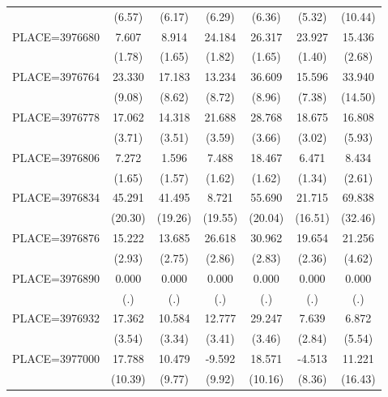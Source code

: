 {\begin{tabular}{l*{6}{c}}
                    &      (6.57)&      (6.17)&      (6.29)&      (6.36)&      (5.32)&     (10.44)\\
PLACE=3976680       &       7.607&       8.914&      24.184&      26.317&      23.927&      15.436\\
                    &      (1.78)&      (1.65)&      (1.82)&      (1.65)&      (1.40)&      (2.68)\\
PLACE=3976764       &      23.330&      17.183&      13.234&      36.609&      15.596&      33.940\\
                    &      (9.08)&      (8.62)&      (8.72)&      (8.96)&      (7.38)&     (14.50)\\
PLACE=3976778       &      17.062&      14.318&      21.688&      28.768&      18.675&      16.808\\
                    &      (3.71)&      (3.51)&      (3.59)&      (3.66)&      (3.02)&      (5.93)\\
PLACE=3976806       &       7.272&       1.596&       7.488&      18.467&       6.471&       8.434\\
                    &      (1.65)&      (1.57)&      (1.62)&      (1.62)&      (1.34)&      (2.61)\\
PLACE=3976834       &      45.291&      41.495&       8.721&      55.690&      21.715&      69.838\\
                    &     (20.30)&     (19.26)&     (19.55)&     (20.04)&     (16.51)&     (32.46)\\
PLACE=3976876       &      15.222&      13.685&      26.618&      30.962&      19.654&      21.256\\
                    &      (2.93)&      (2.75)&      (2.86)&      (2.83)&      (2.36)&      (4.62)\\
PLACE=3976890       &       0.000&       0.000&       0.000&       0.000&       0.000&       0.000\\
                    &         (.)&         (.)&         (.)&         (.)&         (.)&         (.)\\
PLACE=3976932       &      17.362&      10.584&      12.777&      29.247&       7.639&       6.872\\
                    &      (3.54)&      (3.34)&      (3.41)&      (3.46)&      (2.84)&      (5.54)\\
PLACE=3977000       &      17.788&      10.479&      -9.592&      18.571&      -4.513&      11.221\\
                    &     (10.39)&      (9.77)&      (9.92)&     (10.16)&      (8.36)&     (16.43)\\

\end{tabular}}
